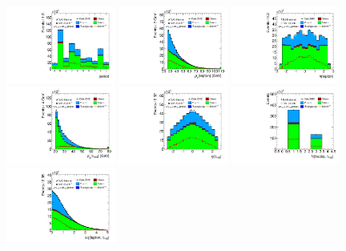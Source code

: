 \clearpage
\begin{figure}[tp]
  \centering
  \includegraphics[width=0.32\textwidth]{figures/presel/period}
  \includegraphics[width=0.32\textwidth]{figures/presel/lep-pt-hi}
  \includegraphics[width=0.32\textwidth]{figures/presel/lep-eta}
  \includegraphics[width=0.32\textwidth]{figures/presel/tau-pt}
  \includegraphics[width=0.32\textwidth]{figures/presel/tau-eta}
  \includegraphics[width=0.32\textwidth]{figures/presel/tau-numTrack}
  \includegraphics[width=0.32\textwidth]{figures/presel/taulep-deta}

\end{figure}
